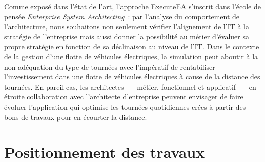 Comme exposé dans l'état de l'art, l'approche ExecuteEA s'inscrit dans l'école
de pensée \emph{Enterprise System Architecting}~: par l'analyse du comportement
de l'architecture, nous souhaitons non seulement vérifier l'alignement de l'IT à
la stratégie de l'entreprise mais aussi donner la possibilité au métier
d'évaluer sa propre stratégie en fonction de sa déclinaison au niveau de l'IT.
Dans le contexte de la gestion d'une flotte de véhicules électriques, la
simulation peut aboutir à la non adéquation du type de tournées avec l'impératif
de rentabiliser l'investissement dans une flotte de véhicules électriques à
cause de la distance des tournées. En pareil cas, les architectes —~métier,
fonctionnel et applicatif~— en étroite collaboration avec l'architecte
d'entreprise peuvent envisager de faire évoluer l'application qui optimise les tournées quotidiennes 
crées à partir des bons de travaux pour en écourter la distance.




 
%

\section{Positionnement des travaux}
\label{sec:positionnement}





